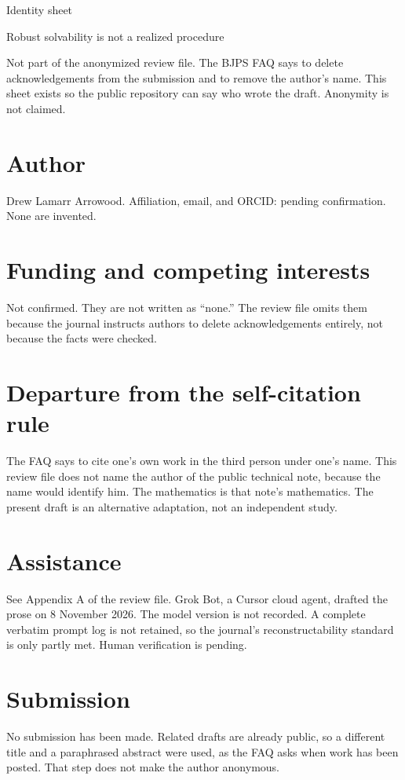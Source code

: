 \documentclass[12pt]{article}
\begin{document}
\begin{center}
{\Large Identity sheet\par}
\vspace{0.5em}
Robust solvability is not a realized procedure\par
\vspace{0.6em}
Not part of the anonymized review file. The BJPS FAQ says to delete acknowledgements from the submission and to remove the author's name. This sheet exists so the public repository can say who wrote the draft. Anonymity is not claimed.\par
\end{center}
\section*{Author}
Drew Lamarr Arrowood. Affiliation, email, and ORCID: pending confirmation. None are invented.

\section*{Funding and competing interests}
Not confirmed. They are not written as ``none.'' The review file omits them because the journal instructs authors to delete acknowledgements entirely, not because the facts were checked.

\section*{Departure from the self-citation rule}
The FAQ says to cite one's own work in the third person under one's name. This review file does not name the author of the public technical note, because the name would identify him. The mathematics is that note's mathematics. The present draft is an alternative adaptation, not an independent study.

\section*{Assistance}
See Appendix A of the review file. Grok Bot, a Cursor cloud agent, drafted the prose on 8 November 2026. The model version is not recorded. A complete verbatim prompt log is not retained, so the journal's reconstructability standard is only partly met. Human verification is pending.

\section*{Submission}
No submission has been made. Related drafts are already public, so a different title and a paraphrased abstract were used, as the FAQ asks when work has been posted. That step does not make the author anonymous.
\end{document}
